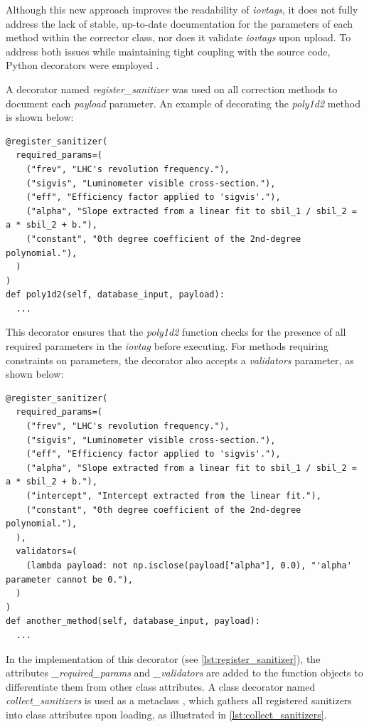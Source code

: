 Although this new approach improves the readability of \textit{iovtags}, it does not fully address the lack of stable, up-to-date documentation for the parameters of each method within the corrector class, nor does it validate \textit{iovtags} upon upload. To address both issues while maintaining tight coupling with the source code, Python decorators were employed \cite{pep318}.

A decorator named \textit{register\_sanitizer} was used on all correction methods to document each \textit{payload} parameter. An example of decorating the \textit{poly1d2} method is shown below:

\begin{lstlisting}
@register_sanitizer(
  required_params=(
    ("frev", "LHC's revolution frequency."),
    ("sigvis", "Luminometer visible cross-section."),
    ("eff", "Efficiency factor applied to 'sigvis'."),
    ("alpha", "Slope extracted from a linear fit to sbil_1 / sbil_2 = a * sbil_2 + b."),
    ("constant", "0th degree coefficient of the 2nd-degree polynomial."),
  )
)
def poly1d2(self, database_input, payload):
  ...
\end{lstlisting}

This decorator ensures that the \textit{poly1d2} function checks for the presence of all required parameters in the \textit{iovtag} before executing. For methods requiring constraints on parameters, the decorator also accepts a \textit{validators} parameter, as shown below:

\begin{lstlisting}
@register_sanitizer(
  required_params=(
    ("frev", "LHC's revolution frequency."),
    ("sigvis", "Luminometer visible cross-section."),
    ("eff", "Efficiency factor applied to 'sigvis'."),
    ("alpha", "Slope extracted from a linear fit to sbil_1 / sbil_2 = a * sbil_2 + b."),
    ("intercept", "Intercept extracted from the linear fit."),
    ("constant", "0th degree coefficient of the 2nd-degree polynomial."),
  ),
  validators=(
    (lambda payload: not np.isclose(payload["alpha"], 0.0), "'alpha' parameter cannot be 0."),
  )
)
def another_method(self, database_input, payload):
  ...
\end{lstlisting}

In the implementation of this decorator (see \autoref{lst:register_sanitizer}), the attributes \textit{\_required\_params} and \textit{\_validators} are added to the function objects to differentiate them from other class attributes. A class decorator named \textit{collect\_sanitizers} is used as a metaclass \cite{pep3115}, which gathers all registered sanitizers into class attributes upon loading, as illustrated in \autoref{lst:collect_sanitizers}.

